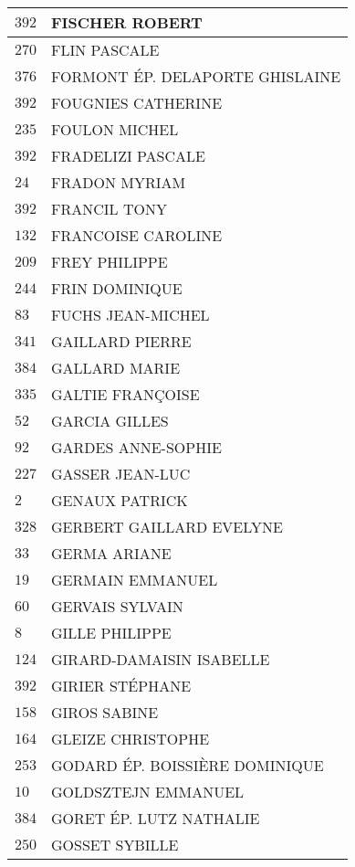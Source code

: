 \begin{xltabular}{\linewidth}{|l|X|}
    \hline
    $392$ & FISCHER ROBERT \\
    \hline
    $270$ & FLIN PASCALE \\
    \hline
    $376$ & FORMONT ÉP. DELAPORTE GHISLAINE \\
    \hline
    $392$ & FOUGNIES CATHERINE \\
    \hline
    $235$ & FOULON MICHEL \\
    \hline
    $392$ & FRADELIZI PASCALE \\
    \hline
    $24$ & FRADON MYRIAM \\
    \hline
    $392$ & FRANCIL TONY \\
    \hline
    $132$ & FRANCOISE CAROLINE \\
    \hline
    $209$ & FREY PHILIPPE \\
    \hline
    $244$ & FRIN DOMINIQUE \\
    \hline
    $83$ & FUCHS JEAN-MICHEL \\
    \hline
    $341$ & GAILLARD PIERRE \\
    \hline
    $384$ & GALLARD MARIE \\
    \hline
    $335$ & GALTIE FRANÇOISE \\
    \hline
    $52$ & GARCIA GILLES \\
    \hline
    $92$ & GARDES ANNE-SOPHIE \\
    \hline
    $227$ & GASSER JEAN-LUC \\
    \hline
    $2$ & GENAUX PATRICK \\
    \hline
    $328$ & GERBERT GAILLARD EVELYNE \\
    \hline
    $33$ & GERMA ARIANE \\
    \hline
    $19$ & GERMAIN EMMANUEL \\
    \hline
    $60$ & GERVAIS SYLVAIN \\
    \hline
    $8$ & GILLE PHILIPPE \\
    \hline
    $124$ & GIRARD-DAMAISIN ISABELLE \\
    \hline
    $392$ & GIRIER STÉPHANE \\
    \hline
    $158$ & GIROS SABINE \\
    \hline
    $164$ & GLEIZE CHRISTOPHE \\
    \hline
    $253$ & GODARD ÉP. BOISSIÈRE DOMINIQUE \\
    \hline
    $10$ & GOLDSZTEJN EMMANUEL \\
    \hline
    $384$ & GORET ÉP. LUTZ NATHALIE \\
    \hline
    $250$ & GOSSET SYBILLE \\

\end{xltabular}
